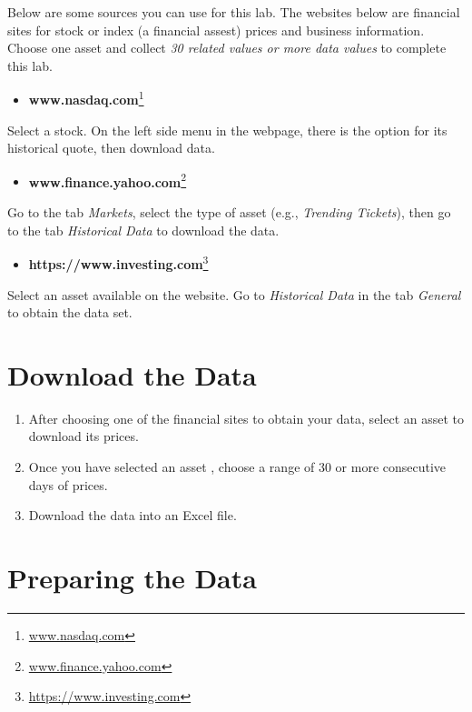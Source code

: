 \documentclass[
  12pt,
  letterpaper,
]{book}
\providecommand{\tightlist}{%
  \setlength{\itemsep}{0pt}\setlength{\parskip}{0pt}}
\DeclareRobustCommand{\href}[2]{#2\footnote{\url{#1}}}
\begin{document}
Below are some sources you can use for this lab. The websites below are financial sites for stock or index (a financial assest) prices and business information. Choose one asset and collect \emph{30 related values or more data values} to complete this lab.

\begin{itemize}
\tightlist
\item
  \href{www.nasdaq.com}{\textbf{www.nasdaq.com}}
\end{itemize}

Select a stock. On the left side menu in the webpage, there is the option for its historical quote, then download data.

\begin{itemize}
\tightlist
\item
  \href{www.finance.yahoo.com}{\textbf{www.finance.yahoo.com}}
\end{itemize}

Go to the tab \emph{Markets}, select the type of asset (e.g., \emph{Trending Tickets}), then go to the tab \emph{Historical Data} to download the data.

\begin{itemize}
\tightlist
\item
  \href{https://www.investing.com}{\textbf{https://www.investing.com}}
\end{itemize}

Select an asset available on the website. Go to \emph{Historical Data} in the tab \emph{General} to obtain the data set.

\hypertarget{download-the-data}{%
\section{Download the Data}\label{download-the-data}}

\begin{enumerate}
\def\labelenumi{\arabic{enumi}.}
\tightlist
\item
  After choosing one of the financial sites to obtain your data, select an asset to download its prices.
\item
  Once you have selected an asset , choose a range of 30 or more consecutive days of prices.
\item
  Download the data into an Excel file.
\end{enumerate}

\hypertarget{preparing-the-data}{%
\section{Preparing the Data}\label{preparing-the-data}}
\end{document}
